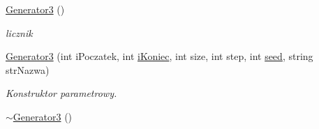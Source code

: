 \begin{DoxyCompactItemize}
\item 
\hyperlink{classGenerator3_a6817e5557639442bef9bc31993b8ba59}{Generator3} ()
\begin{DoxyCompactList}\small\item\em licznik \end{DoxyCompactList}\item 
\hyperlink{classGenerator3_a09577a1241a84b682f2b0a8fab79a04c}{Generator3} (int i\+Poczatek, int \hyperlink{classGenerator_a235b3d02ce62d19e803cc2295eb7911e}{i\+Koniec}, int size, int step, int \hyperlink{classGenerator_ae77446ccb4946b8eb28d0f20f3e4a95f}{seed}, string str\+Nazwa)
\begin{DoxyCompactList}\small\item\em Konstruktor parametrowy. \end{DoxyCompactList}\item 
\hypertarget{classGenerator3_a031ad6458f193c019538bc890fd57e88}{\hyperlink{classGenerator3_a031ad6458f193c019538bc890fd57e88}{$\sim$\+Generator3} ()}\label{classGenerator3_a031ad6458f193c019538bc890fd57e88}


\end{DoxyCompactItemize}
